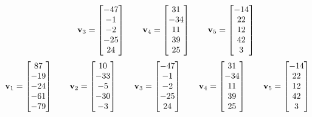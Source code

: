 \begin{tasks}[resume, style=enumerate]
\begin{align*}
    \qquad
    \mathbf v_3
    = \begin{bmatrix} -47 \\ -1 \\ -2 \\ -25 \\ 24 \end{bmatrix}
    \qquad
    \mathbf v_4
    = \begin{bmatrix} 31 \\ -34\\ 11 \\ 39 \\ 25 \end{bmatrix}
    \qquad
    \mathbf v_5
    = \begin{bmatrix}-14 \\ 22 \\ 12 \\ 42 \\ 3\end{bmatrix}
  \end{align*}
\task \faCalculator
  \begin{align*}
    \mathbf v_1
    = \begin{bmatrix} 87 \\ -19 \\ -24 \\ -61 \\ -79 \end{bmatrix}
    \qquad
    \mathbf v_2
    = \begin{bmatrix} 10 \\ -33 \\ -5 \\ -30 \\ -3 \end{bmatrix}
    \qquad
    \mathbf v_3
    = \begin{bmatrix} -47 \\ -1 \\ -2 \\ -25 \\ 24 \end{bmatrix}
    \qquad
    \mathbf v_4
    = \begin{bmatrix} 31 \\ -34\\ 11 \\ 39 \\ 25 \end{bmatrix}
    \qquad
    \mathbf v_5
    = \begin{bmatrix}-14 \\ 22 \\ 12 \\ 42 \\ 3\end{bmatrix}
  \end{align*}
\end{tasks}
